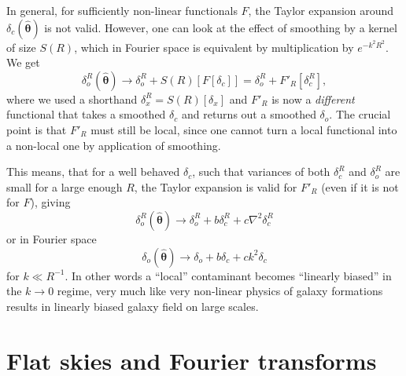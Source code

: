 \documentclass[usenatbib]{mnrasb}
\newcommand{\nv}{\hat{\boldsymbol{\theta}}}
\begin{document}
    In general, for sufficiently non-linear functionals $F$, the Taylor expansion around $\delta_c(\nv)$ is not valid. However, one can look at the effect of smoothing by a kernel of size $S(R)$, which in Fourier space is equivalent by multiplication by $e^{-k^2R^2}$. We get
    \begin{equation}
      \delta^R_o(\nv) \rightarrow \delta^R_o  + S(R)[F [ \delta_c  ]] =  \delta^R_o + F'_R [ \delta^R_c ],
    \end{equation}
    where we used a shorthand $\delta_x^R=S(R)[\delta_x]$ and  $F'_R$ is now a \emph{different} functional that takes a smoothed $\delta_c$ and returns out a smoothed $\delta_o$.  The crucial point is that $F'_R$ must still be local, since one cannot turn a local functional into a non-local one by application of smoothing.

    This means, that for a well behaved $\delta_c$, such that variances of both $\delta^R_c$ and $\delta^R_o$ are small for a large enough $R$, the Taylor expansion is valid for $F'_R$ (even if it is not for $F$), giving
    \begin{equation}
      \delta^R_o(\nv) \rightarrow \delta^R_o  + b \delta^R_c + c \nabla^2 \delta^R_c
    \end{equation}
    or in Fourier space
    \begin{equation}
      \delta_o(\nv) \rightarrow \delta_o  + b \delta_c + c k^2 \delta_c
    \end{equation}
    for $k\ll R^{-1}$. In other words a ``local'' contaminant becomes ``linearly biased'' in the $k\rightarrow 0 $ regime, very much like very non-linear physics of galaxy formations results in linearly biased galaxy field on large scales.

  \section{Flat skies and Fourier transforms}\label{app:flat}
\end{document}

